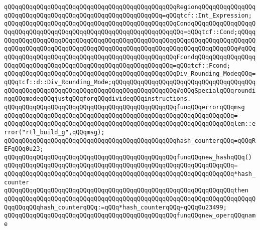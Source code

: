 \verb|qQQqqQQqqQQqqQQqqQQqqQQqqQQqqQQqqQQqqQQqqQQqqQQqRegionqQQqqQQqqQQqqQQqqQQqqQQqqQQqqQQqqQQqqQQqqQQqqQQqqQQqqQQqqQQq=qQQqtcf::Int_Expression;|\newline
\verb|qQQqqQQqqQQqqQQqqQQqqQQqqQQqqQQqqQQqqQQqqQQqqQQqCondqQQqqQQqqQQqqQQqqQQqqQQqqQQqqQQqqQQqqQQqqQQqqQQqqQQqqQQqqQQqqQQqqQQq=qQQqtcf::Cond;qQQqqQQqqQQqqQQqqQQqqQQqqQQqqQQqqQQqqQQqqQQqqQQqqQQqqQQqqQQqqQQqqQQqqQQqqQQqqQQqqQQqqQQqqQQqqQQqqQQqqQQqqQQqqQQqqQQqqQQqqQQqqQQqqQQqqQQqqQQq#qQQq|\newline
\verb|qQQqqQQqqQQqqQQqqQQqqQQqqQQqqQQqqQQqqQQqqQQqqQQqFcondqQQqqQQqqQQqqQQqqQQqqQQqqQQqqQQqqQQqqQQqqQQqqQQqqQQqqQQqqQQqqQQq=qQQqtcf::Fcond;|\newline
\newline
\verb|qQQqqQQqqQQqqQQqqQQqqQQqqQQqqQQqqQQqqQQqqQQqqQQqDiv_Rounding_ModeqQQq=qQQqtcf::d::Div_Rounding_Mode;qQQqqQQqqQQqqQQqqQQqqQQqqQQqqQQqqQQqqQQqqQQqqQQqqQQqqQQqqQQqqQQqqQQqqQQqqQQqqQQqqQQqqQQq#qQQqSpecialqQQqroundingqQQqmodeqQQqjustqQQqforqQQqdivideqQQqinstructions.|\newline
\newline
\verb|qQQqqQQqqQQqqQQqqQQqqQQqqQQqqQQqqQQqqQQqqQQqqQQqfunqQQqerrorqQQqmsg|\newline
\verb|qQQqqQQqqQQqqQQqqQQqqQQqqQQqqQQqqQQqqQQqqQQqqQQqqQQqqQQqqQQqqQQq=|\newline
\verb|qQQqqQQqqQQqqQQqqQQqqQQqqQQqqQQqqQQqqQQqqQQqqQQqqQQqqQQqqQQqqQQqlem::error("rtl_build_g",qQQqmsg);|\newline
\newline
\verb|qQQqqQQqqQQqqQQqqQQqqQQqqQQqqQQqqQQqqQQqqQQqqQQqhash_counterqQQq=qQQqREFqQQq0u23;|\newline
\newline
\verb|qQQqqQQqqQQqqQQqqQQqqQQqqQQqqQQqqQQqqQQqqQQqqQQqfunqQQqnew_hashqQQq()|\newline
\verb|qQQqqQQqqQQqqQQqqQQqqQQqqQQqqQQqqQQqqQQqqQQqqQQqqQQqqQQqqQQqqQQq=|\newline
\verb|qQQqqQQqqQQqqQQqqQQqqQQqqQQqqQQqqQQqqQQqqQQqqQQqqQQqqQQqqQQqqQQq*hash_counter|\newline
\verb|qQQqqQQqqQQqqQQqqQQqqQQqqQQqqQQqqQQqqQQqqQQqqQQqqQQqqQQqqQQqqQQqthen|\newline
\verb|qQQqqQQqqQQqqQQqqQQqqQQqqQQqqQQqqQQqqQQqqQQqqQQqqQQqqQQqqQQqqQQqqQQqqQQqqQQqqQQqhash_counterqQQq:=qQQq*hash_counterqQQq+qQQq0u23499;|\newline
\newline
\verb|qQQqqQQqqQQqqQQqqQQqqQQqqQQqqQQqqQQqqQQqqQQqqQQqfunqQQqnew_operqQQqname|\newline
